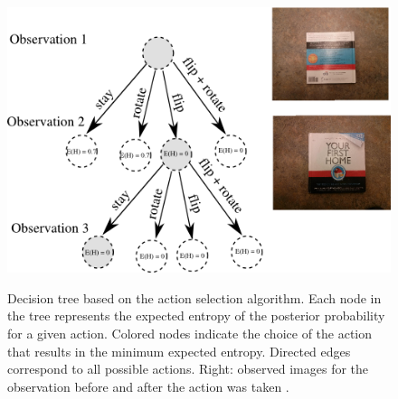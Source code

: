         
    \begin{figure}
            \includegraphics[width = \columnwidth]{pics/tree_small2.png}
        \label{fig:tree}
        \caption{Decision tree based on the action selection algorithm. Each node in the tree represents the expected entropy of the posterior probability for a given action. Colored nodes indicate the choice of the action that results in the minimum expected entropy. Directed edges correspond to all possible actions. Right: observed images for the observation before and after the action was taken . }
    \end{figure}
    
